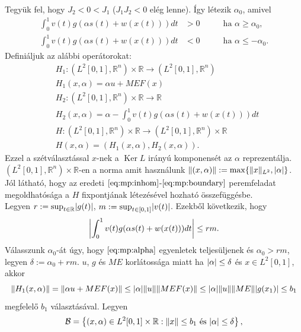 \documentclass[oneside, titlepage, 12pt, a4paper]{report}
\DeclareMathOperator{\Ker}{Ker}	%
\DeclarePairedDelimiter\norm{\lVert}{\rVert}	%
\DeclarePairedDelimiter\abs{\lvert}{\rvert}	%
\begin{document}
Tegyük fel, hogy $J_2 < 0 < J_1$ ($J_1 J_2 < 0$ elég lenne). Így létezik $\alpha_0$, amivel
\begin{align}
\int_0^1 v(t) g(\alpha s(t) + w(x(t))) dt &> 0 \qquad &\text{ha } \alpha \geq \alpha_0, \label{eq:mp:alpha} \\
\int_0^1 v(t) g(\alpha s(t) + w(x(t))) dt &< 0 \qquad &\text{ha } \alpha \leq -\alpha_0. \nonumber
\end{align}
Definiáljuk az alábbi operátorokat:
\begin{align*}
&H_1 : ( L^2[0, 1], \mathbb{R}^n) \times \mathbb{R} \rightarrow ( L^2[0, 1], \mathbb{R}^n) \\
&H_1(x, \alpha) = \alpha u + M E F (x) \\
&H_2 :  ( L^2[0, 1], \mathbb{R}^n) \times \mathbb{R} \rightarrow \mathbb{R} \\
&H_2(x, \alpha) = \alpha - \int_0^1 v(t) g(\alpha s(t) + w(x(t))) dt \\
&H : ( L^2[0, 1], \mathbb{R}^n) \times \mathbb{R} \rightarrow ( L^2[0, 1], \mathbb{R}^n) \times \mathbb{R} \\
&H(x, \alpha) = (H_1 (x, \alpha), H_2(x, \alpha)).
\end{align*}
Ezzel a szétválasztással $x$-nek a $\Ker L$ irányú komponensét az $\alpha$ reprezentálja. $( L^2[0, 1], \mathbb{R}^n) \times \mathbb{R}$-en a norma amit használunk $\norm{(x, \alpha)} := \max \{ \norm{x}_{L^2}, \abs{\alpha} \}$. Jól látható, hogy az eredeti $\eqref{eq:mp:inhom}$-$\eqref{eq:mp:boundary}$ peremfeladat megoldhatósága a $H$ fixpontjának létezésével hozható összefüggésbe. \\
Legyen $r := \sup_{t \in \mathbb{R}} \abs{g(t)}$, $m := \sup_{t \in [0, 1]} \abs{v(t)}$. Ezekből következik, hogy
\begin{equation*}
\abs*{ \int_0^1 v(t) g(\alpha s(t) + w(x(t))) dt} \leq rm.
\end{equation*}
Válasszunk $\alpha_0$-át úgy, hogy $\eqref{eq:mp:alpha}$ egyenletek teljesüljenek és $\alpha_0 > rm$, legyen $\delta := \alpha_0 + rm$. $u$, $g$ és $M E$ korlátossága miatt ha $\abs{\alpha} \leq \delta$ és $x \in L^2[0, 1]$, akkor
\begin{equation*}
\norm{H_1 (x, \alpha)} = \norm{ \alpha u + M E F (x)} \leq \abs{\alpha} \norm{u} \norm{M E F (x)} \leq \abs{\alpha} \norm{u} \norm{M E} \abs{g(x_1)} \leq b_1
\end{equation*}
megfelelő $b_1$ választásával. Legyen
\begin{equation*}
\mathcal{B} = \left\{ (x, \alpha) \in L^2[0, 1] \times \mathbb{R} : \norm{x} \leq b_1 \text{ és } \abs{\alpha} \leq \delta \right\},
\end{equation*}
\end{document}
